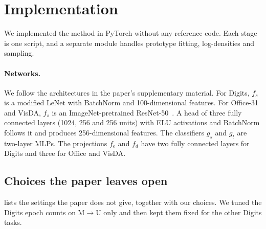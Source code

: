 \section{Implementation}\label{sec:implementation}

We implemented the method in PyTorch without any reference code.
Each stage is one script, and a separate module handles prototype fitting, log-densities and sampling.

\paragraph{Networks.}
We follow the architectures in the paper's supplementary material.
For Digits, $f_s$ is a modified LeNet with BatchNorm and 100-dimensional features.
For Office-31 and VisDA, $f_s$ is an ImageNet-pretrained ResNet-50~\citep{he2016resnet}.
A head of three fully connected layers (1024, 256 and 256 units) with ELU activations and BatchNorm follows it and produces 256-dimensional features.
The classifiers $g_s$ and $g_t$ are two-layer MLPs.
The projections $f_e$ and $f_d$ have two fully connected layers for Digits and three for Office and VisDA.

\subsection{Choices the paper leaves open}\label{sec:choices}
 lists the settings the paper does not give, together with our choices.
We tuned the Digits epoch counts on M$\to$U only and then kept them fixed for the other Digits tasks.

